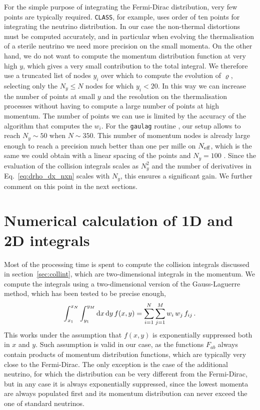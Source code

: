 \documentclass[notitlepage,showpacs,preprintnumbers,amsmath,amssymb,superscriptaddress,prd,onecolumn]{revtex4-1}
\newcommand{\Neff}{\ensuremath{N_{\rm eff}}}
\begin{document}
For the simple purpose of integrating the Fermi-Dirac distribution, very few points are typically required.
\texttt{CLASS}, for example, uses order of ten points for integrating the neutrino distribution.
In our case the non-thermal distortions must be computed accurately, and in particular
when evolving the thermalisation of a sterile neutrino we need more precision on the small momenta.
On the other hand, we do not want to compute the momentum distribution function at very high $y$,
which gives a very small contribution to the total integral. We therefore use a truncated list of nodes $y_i$ over which to compute the evolution of $\varrho$,
selecting only the $N_y\leq N$ nodes for which $y_i<20$.
In this way we can increase the number of points at small $y$ and the resolution on the thermalisation processes
without having to compute a large number of points at high momentum.
The number of points we can use is limited by the accuracy of the algorithm that computes the $w_i$.
For the \texttt{gaulag} routine \cite{NR}, our setup allows to reach $N_y\sim50$ when $N\sim350$.
This number of momentum nodes is already large enough to reach a precision
much better than one per mille on \Neff, which is the same we could obtain with a linear spacing of the points
and $N_y=100$ \cite{deSalas:2016ztq}.
Since the evaluation of the collision integrals scales as $N_y^2$
and the number of derivatives in Eq.~\eqref{eq:drho_dx_nxn} scales with $N_y$,
this ensures a significant gain.
We further comment on this point in the next sections.


\section{Numerical calculation of 1D and 2D integrals}
\label{ssec:integrals}
Most of the processing time is spent to compute the collision integrals
discussed in section~\ref{sec:collint}, which are two-dimensional integrals in the momentum.
We compute the integrals using a two-dimensional version of the Gauss-Laguerre method,
which has been tested to be precise enough,
%
\begin{equation}
\int_{x_1}^{x_N}\int_{y_1}^{y_M}{\rm d}x\, \mathrm{d}y\, f(x, y)
=
\sum_{i=1}^{N}\sum_{j=1}^{M}
w_i\,w_j\,f_{ij}
\,.
\end{equation}
This works under the assumption that $f(x,y)$ is exponentially suppressed both in $x$ and $y$.
Such assumption is valid in our case, as the functions $F_{ab}$ always contain products of momentum distribution functions,
which are typically very close to the Fermi-Dirac.
The only exception is the case of the additional neutrino, for which the distribution can be very different from the Fermi-Dirac,
but in any case it is always exponentially suppressed, since the lowest momenta
are always populated first and its momentum distribution can never exceed the one of standard neutrinos.
\end{document}
